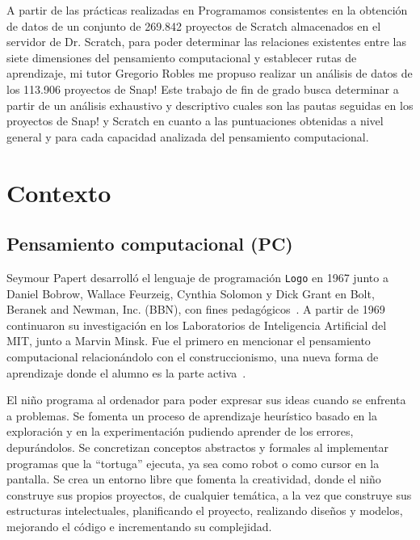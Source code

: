 \documentclass[a4paper, 12pt]{book}
\begin{document}
A partir de las prácticas realizadas en Programamos consistentes en la obtención de datos de un conjunto de 269.842 proyectos de Scratch almacenados en el servidor de Dr. Scratch, para poder determinar las relaciones existentes entre las siete dimensiones del pensamiento computacional y establecer rutas de aprendizaje, mi tutor Gregorio Robles me propuso realizar un análisis de datos de los 113.906 proyectos de Snap! Este trabajo de fin de grado busca determinar a partir de un análisis exhaustivo y descriptivo cuales son las pautas seguidas en los proyectos de Snap! y Scratch en cuanto a las puntuaciones obtenidas a nivel general y para cada capacidad analizada del pensamiento computacional. 

\section{Contexto}
\label{sec:contexto}

\subsection{Pensamiento computacional (PC)}
\label{subsec:pc}
Seymour Papert desarrolló el lenguaje de programación \texttt{Logo} en 1967 junto a Daniel Bobrow, Wallace Feurzeig, Cynthia Solomon y Dick Grant en Bolt, Beranek and Newman, Inc. (BBN), con fines pedagógicos~\cite{solomon20:_history}. A partir de 1969 continuaron su investigación en los Laboratorios de Inteligencia Artificial del MIT, junto a Marvin Minsk. Fue el primero en mencionar el pensamiento computacional relacionándolo con el construccionismo, una nueva forma de aprendizaje donde el alumno es la parte activa~\cite{papert80:_mindstorm}.

El niño programa al ordenador para poder expresar sus ideas cuando se enfrenta a problemas. Se fomenta un proceso de aprendizaje heurístico basado en la exploración y en la experimentación pudiendo aprender de los errores, depurándolos. Se concretizan conceptos abstractos y formales al implementar programas que la ``tortuga'' ejecuta, ya sea como robot o como cursor en la pantalla. Se crea un entorno libre que fomenta la creatividad, donde el niño construye sus propios proyectos, de cualquier temática, a la vez que construye sus estructuras intelectuales, planificando el proyecto, realizando diseños y modelos, mejorando el código e incrementando su complejidad.
\end{document}
